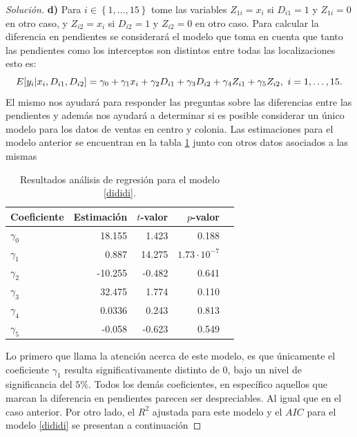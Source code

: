 \documentclass[10.5pt,notitlepage]{article}
\newenvironment{solucion}
  {\begin{proof}[Solución]}
  {\end{proof}}
\newcommand{\kis}[1]{\left\{ #1 \right\}}
\theoremstyle{plain}
\begin{document}
\begin{solucion}
\noindent \textbf{d)} Para \(i \in \kis{1,\hdots,15}\) tome las variables \(Z_{1i} = x_i\) si \(D_{i1} = 1\) y \(Z_{1i} =0\) en otro caso, y \(Z_{i2} = x_i\) si \(D_{i2} = 1\) y \(Z_{i2} =0\) en otro caso. Para calcular la diferencia en pendientes se considerará el modelo que toma en cuenta que tanto las pendientes como los interceptos son distintos entre todas las localizaciones esto es: 
\begin{equation}\label{dididi}
E[y_i | x_i, D_{i1}, D_{i2}] = \gamma_{0} + \gamma_{1}x_{i} + \gamma_{2}D_{i1} + \gamma_{3}D_{i2}+ \gamma_{4} Z_{i1} + \gamma_{5} Z_{i2}, \ i = 1, \hdots, 15.\\
\end{equation}
El mismo nos ayudará para responder las preguntas sobre las diferencias entre las pendientes y además nos ayudará a determinar si es posible considerar un único modelo para los datos de ventas en centro y colonia. Las estimaciones para el modelo anterior se encuentran en la tabla \ref{tab:reg_234} junto con otros datos asociados a las mismas 
\begin{table}[H]
        \centering
        \begin{tabular}{@{}l@{\hskip 0.3in}r@{\hskip 0.3in}r@{\hskip 0.3in}r@{\hskip 0.3in}r@{}}
            \toprule
            Coeficiente& Estimación &\(t\)-valor& \(p\)-valor \\
            \midrule
\(\gamma_{0}\)&  18.155 &    1.423&    0.188    \\
\(\gamma_{1}\)&  0.887  &   14.275& \(1.73\cdot 10^{-7}\)\\ 
\(\gamma_{2}\)& -10.255 &   -0.482&    0.641    \\
\(\gamma_{3}\)&  32.475 &    1.774&    0.110  \\
\(\gamma_{4}\)& 0.0336  &    0.243&    0.813  \\
\(\gamma_{5}\)& -0.058  &   -0.623&    0.549  \\
            \bottomrule
        \end{tabular}
        \caption{Resultados análisis de regresión para el modelo \eqref{dididi}.}
        \label{tab:reg_234}
\end{table}
Lo primero que llama la atención acerca de este modelo, es que únicamente el coeficiente \(\gamma_{1}\) resulta significativamente distinto de \(0\), bajo un nivel de significancia del \(5\%\). Todos los demás coeficientes, en específico aquellos que marcan la diferencia en pendientes parecen ser despreciables. Al igual que en el caso anterior. Por otro lado, el \(R^2\) ajustada para este modelo y el \(AIC\) para el modelo \eqref{dididi} se presentan a continuación

\end{solucion}
\end{document}
